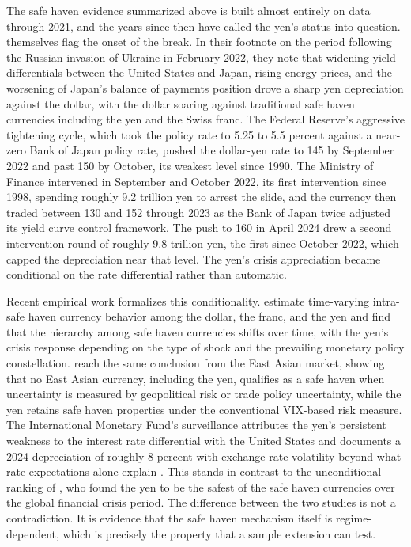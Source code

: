 The safe haven evidence summarized above is built almost entirely on data through 2021, and the years since then have called the yen's status into question. \textcite{beirne_sugandi_2023} themselves flag the onset of the break. In their footnote on the period following the Russian invasion of Ukraine in February 2022, they note that widening yield differentials between the United States and Japan, rising energy prices, and the worsening of Japan's balance of payments position drove a sharp yen depreciation against the dollar, with the dollar soaring against traditional safe haven currencies including the yen and the Swiss franc. The Federal Reserve's aggressive tightening cycle, which took the policy rate to 5.25 to 5.5 percent against a near-zero Bank of Japan policy rate, pushed the dollar-yen rate to 145 by September 2022 and past 150 by October, its weakest level since 1990. The Ministry of Finance intervened in September and October 2022, its first intervention since 1998, spending roughly 9.2 trillion yen to arrest the slide, and the currency then traded between 130 and 152 through 2023 as the Bank of Japan twice adjusted its yield curve control framework. The push to 160 in April 2024 drew a second intervention round of roughly 9.8 trillion yen, the first since October 2022, which capped the depreciation near that level. The yen's crisis appreciation became conditional on the rate differential rather than automatic.

Recent empirical work formalizes this conditionality. \textcite{park_fang_2025} estimate time-varying intra-safe haven currency behavior among the dollar, the franc, and the yen and find that the hierarchy among safe haven currencies shifts over time, with the yen's crisis response depending on the type of shock and the prevailing monetary policy constellation. \textcite{lu_yu_li_li_2024} reach the same conclusion from the East Asian market, showing that no East Asian currency, including the yen, qualifies as a safe haven when uncertainty is measured by geopolitical risk or trade policy uncertainty, while the yen retains safe haven properties under the conventional VIX-based risk measure. The International Monetary Fund's surveillance attributes the yen's persistent weakness to the interest rate differential with the United States and documents a 2024 depreciation of roughly 8 percent with exchange rate volatility beyond what rate expectations alone explain \parencite{imf_2024,imf_2025}. This stands in contrast to the unconditional ranking of \textcite{fatum_yamamoto_2015}, who found the yen to be the safest of the safe haven currencies over the global financial crisis period. The difference between the two studies is not a contradiction. It is evidence that the safe haven mechanism itself is regime-dependent, which is precisely the property that a sample extension can test.

